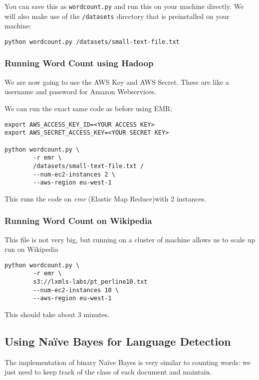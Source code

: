 You can save this as \texttt{wordcount.py} and run this on your machine
directly. We will also make use of the \texttt{/datasets} directory that is
preinstalled on your machine:

\begin{verbatim}
python wordcount.py /datasets/small-text-file.txt
\end{verbatim}

\subsubsection{Running Word Count using Hadoop}

We are now going to use the AWS Key and AWS Secret. These are like a username
and password for Amazon Webservices.

We can run the exact same code as before using EMR:

\begin{verbatim}
export AWS_ACCESS_KEY_ID=<YOUR ACCESS KEY>
export AWS_SECRET_ACCESS_KEY=<YOUR SECRET KEY>

python wordcount.py \
        -r emr \
        /datasets/small-text-file.txt /
        --num-ec2-instances 2 \
        --aws-region eu-west-1
\end{verbatim}

This runs the code on \emph{emr} (Elastic Map Reduce)with 2 instances.

\subsubsection{Running Word Count on Wikipedia}

This file is not very big, but running on a cluster of machine allows us to
scale up run on Wikipedia

\begin{verbatim}
python wordcount.py \
        -r emr \
        s3://lxmls-labs/pt_perline10.txt
        --num-ec2-instances 10 \
        --aws-region eu-west-1
\end{verbatim}

This should take about 3 minutes.

\subsection{Using Naïve Bayes for Language Detection}

The implementation of binary Naïve Bayes is very similar to counting words: we just
need to keep track of the class of each document and maintain.

